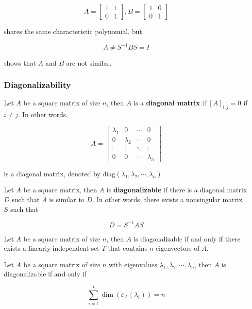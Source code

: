 \documentclass[a4paper,12pt]{article}
\begin{document}
$$A=\begin{bmatrix}
  1 & 1\\
  0 & 1
\end{bmatrix},B=\begin{bmatrix}
  1 & 0\\
  0 & 1
\end{bmatrix}$$\s

shares the same characteristic polynomial, but

$$A\neq S^{-1}BS=I$$\s

shows that $A$ and $B$ are not similar.

\propdisp
\subsubsection{Diagonalizability}
\begin{dft}
  Let $A$ be a square matrix of size $n$, then $A$ is a \textbf{diagonal matrix} if $[A]_{i,j}=0$ if $i\neq j$. In other words,

  $$A=\begin{bmatrix}
    \lambda_{1} & 0 & \cdots & 0\\
    0 & \lambda_{2} & \cdots & 0\\
    \vdots & \vdots & \ddots & \vdots\\
    0 & 0 & \cdots & \lambda_{n}
  \end{bmatrix}$$\s

  is a diagonal matrix, denoted by $\mathrm{diag}(\lambda_{1},\lambda_{2},\cdots,\lambda_{n})$.
\end{dft}\n

\begin{dft}
  Let $A$ be a square matrix, then $A$ is \textbf{diagonalizable} if there is a diagonal matrix $D$ such that $A$ is similar to $D$. In other words, there exists a nonsingular matrix $S$ such that

  $$D=S^{-1}AS$$
\end{dft}\n

\begin{thm}
  Let $A$ be a square matrix of size $n$, then $A$ is diagonalizable if and only if there exists a linearly independent set $T$ that contains $n$ eigenvectors of $A$.
\end{thm}\n

\begin{thm}
  Let $A$ be a square matrix of size $n$ with eigenvalues $\lambda_{1},\lambda_{2},\cdots,\lambda_{n}$, then $A$ is diagonalizable if and only if

  $$\sum_{i=1}^{k}\dim(\varepsilon_{A}(\lambda_{i}))=n$$
\end{thm}\n
\end{document}
